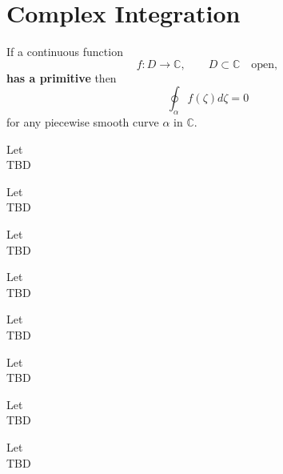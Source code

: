\section{Complex Integration}


\begin{theorem}
    \label{sec:ClosedContourT}
    If a continuous function
    $$ f : D \rightarrow \mathbb{C}, \qquad D \subset \mathbb{C} \quad \text{open},$$
    \textbf{has a primitive} then
    $$\oint_\alpha f(\zeta)d\zeta = 0$$
    for any piecewise smooth curve $\alpha$ in $\mathbb{C}$.
\end{theorem}


\begin{theorem}
    \label{sec:MainTCalculus}
    Let \\
    TBD
\end{theorem}


\begin{theorem}
    \label{sec:CauchyITT}
    Let \\
    TBD
\end{theorem}


\begin{theorem}
    \label{sec:CauchyITR}
    Let \\
    TBD
\end{theorem}


\begin{theorem}
    \label{sec:CauchyIF}
    Let \\
    TBD
\end{theorem}


\begin{theorem}
    \label{sec:GCauchyIF}
    Let \\
    TBD
\end{theorem}


\begin{theorem}
    \label{sec:MoreraT}
    Let \\
    TBD
\end{theorem}


\begin{theorem}
    \label{sec:LiouvilleT}
    Let \\
    TBD
\end{theorem}


\begin{theorem}
    \label{sec:FTAlgebra}
    Let \\
    TBD
\end{theorem}